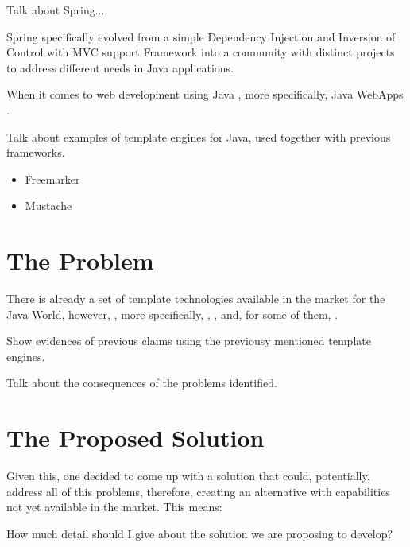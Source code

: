 \begin{expand}
    Talk about Spring...\cite{Johnson2005ProfessionalFramework}
    
    Spring specifically evolved from a simple Dependency Injection and Inversion of Control with MVC support Framework into a community with distinct projects to address different needs in Java applications.
\end{expand}

When it comes to web development using Java \cite{Bloch2008EffectiveSeries}, more specifically, Java WebApps \cite{Williams2014ProfessionalApplications}.

\begin{expand}
    Talk about examples of template engines for Java, used together with previous frameworks.
    \begin{itemize}
        \item Freemarker \cite{Forsythe2013InstantFreemarker}
        \item Mustache
        \cite{Forsythe2013InstantFreemarker}
    \end{itemize}
\end{expand}

\section{The Problem}

There is already a set of template technologies available in the market for the Java World, however, , more specifically, , ,  and, for some of them, . 

\begin{expand}
    Show evidences of previous claims using the previousy mentioned template engines.
\end{expand}

\begin{expand}
    Talk about the consequences of the problems identified.
\end{expand}

\section{The Proposed Solution}

Given this, one decided to come up with a solution that could, potentially, address all of this problems, therefore, creating an alternative with capabilities not yet available in the market. This means:


\begin{orientador}
    How much detail should I give about the solution we are proposing to develop?
\end{orientador}